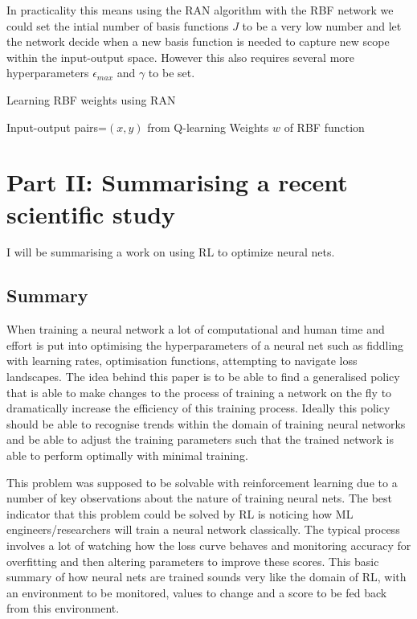 \documentclass[sigconf]{acmart}
\begin{document}
In practicality this means using the RAN algorithm with the RBF network we could set the intial number of basis functions $J$ to be a very low number and let the network decide when a new basis function is needed to capture new scope within the input-output space.
However this also requires several more hyperparameters $\epsilon_{max}$ and $\gamma$ to be set.
\begin{algorithm}
  \caption{Learning RBF weights using RAN}
  \begin{algorithmic}
    \Require Input-output pairs=$(x,y)$ from Q-learning
    \Ensure Weights $w$ of RBF function
    \Else 
    \EndIf
    \EndFor
  \end{algorithmic}
\end{algorithm}
\section{Part II: Summarising a recent scientific study}
I will be summarising a work on using RL to optimize neural nets\cite{li2017learning}.
\subsection{Summary}
When training a neural network a lot of computational and human time and effort is put into optimising the hyperparameters of a neural net such as fiddling with learning rates, optimisation functions, attempting to navigate loss landscapes.
The idea behind this paper is to be able to find a generalised policy that is able to make changes to the process of training a network on the fly to dramatically increase the efficiency of this training process.
Ideally this policy should be able to recognise trends within the domain of training neural networks and be able to adjust the training parameters such that the trained network is able to perform optimally with minimal training.
  
This problem was supposed to be solvable with reinforcement learning due to a number of key observations about the nature of training neural nets.
The best indicator that this problem could be solved by RL is noticing how ML engineers/researchers will train a neural network classically. The typical process involves a lot of watching how the loss curve behaves and monitoring accuracy for overfitting and then altering parameters to improve these scores.
This basic summary of how neural nets are trained sounds very like the domain of RL, with an environment to be monitored, values to change and a score to be fed back from this environment.
\end{document}
